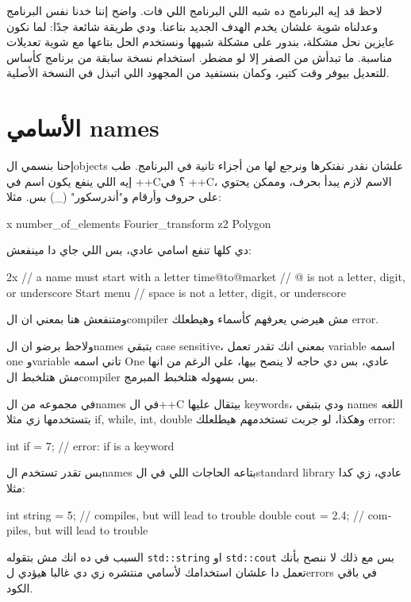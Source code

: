 \documentclass[11pt]{article}
\let\OriginalVerbatim\verbatim
\let\endOriginalVerbatim\endverbatim
\renewenvironment{verbatim}{\begin{english}\OriginalVerbatim}{\endOriginalVerbatim\end{english}}
\begin{document}
لاحظ قد إيه البرنامج ده شبه اللي البرنامج اللي فات. واضح إننا خدنا نفس البرنامج وعدلناه شوية علشان يخدم الهدف الجديد بتاعنا. ودي طريقة شائعة جدًا: لما نكون عايزين نحل مشكلة، بندور على مشكلة شبهها ونستخدم الحل بتاعها مع شوية تعديلات مناسبة. ما تبدأش من الصفر إلا لو مضطر. استخدام نسخة سابقة من برنامج كأساس للتعديل بيوفر وقت كتير، وكمان بنستفيد من المجهود اللي اتبذل في النسخة الأصلية.
\section{الأسامي names}
\label{sec:orgf3ac696}
إحنا بنسمي الobjects علشان نقدر نفتكرها ونرجع لها من أجزاء تانية في البرنامج. طب إيه اللي ينفع يكون اسم في ++C؟
في ++C، الاسم لازم يبدأ بحرف، وممكن يحتوي على حروف وأرقام و"أندرسكور" (\_) بس. مثلا:

\begin{verbatim}
x
number_of_elements
Fourier_transform
z2
Polygon
\end{verbatim}

دي كلها تنفع اسامي عادي، بس اللي جاي دا مينفعش:

\begin{verbatim}
2x              // a name must start with a letter
time@to@market  // @ is not a letter, digit, or underscore
Start menu      // space is not a letter, digit, or underscore
\end{verbatim}

ومتنفعش هنا بمعني ان الcompiler مش هيرضي يعرفهم كأسماء وهيطعلك error.

ولاحظ برضو ان الnames بتبقي case sensitive، بمعني انك تقدر تعمل variable اسمه one وvariable تاني اسمه One عادي، بس دي حاجه لا ينصح بيها، علي الرغم من انها مش هتلخبط الcompiler بس بسهوله هتلخبط المبرمج.

في مجموعه من الnames في ال++C بيتقال عليها keywords، ودي بتبقي names اللغه بتستخدمها زي مثلا if, while, int, double وهكذا، لو جربت تستخدمهم هيطلعلك error:

\begin{verbatim}
int if = 7;  // error: if is a keyword
\end{verbatim}

بس تقدر تستخدم الnames بتاعه الحاجات اللي في الstandard library عادي، زي كدا مثلا:

\begin{verbatim}
int string = 5;     // compiles, but will lead to trouble
double cout = 2.4;  // compiles, but will lead to trouble
\end{verbatim}

السبب في ده انك مش بتقوله \texttt{std::string} او \texttt{std::cout} بس مع ذلك لا ننصح بأنك تعمل دا علشان استخدامك لأسامي منتشره زي دي غالبا هيؤدي لerrors في باقي الكود.
\end{document}
